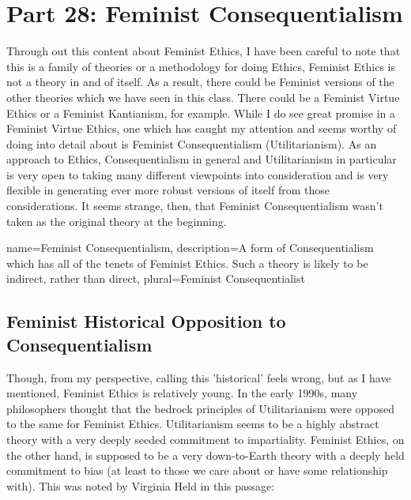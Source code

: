 \chapter{Part 28: Feminist Consequentialism}

Through out this content about Feminist Ethics, I have been careful to note that this is a family of theories or a methodology for doing Ethics, Feminist Ethics is not a theory in and of itself. As a result, there could be Feminist versions of the other theories which we have seen in this class. There could be a Feminist Virtue Ethics or a Feminist Kantianism, for example. While I do see great promise in a Feminist Virtue Ethics, one which has caught my attention and seems worthy of doing into detail about is \gls{Feminist Consequentialism} (Utilitarianism).\autocite{Driver2} As an approach to Ethics, Consequentialism in general and Utilitarianism in particular is very open to taking many different viewpoints into consideration and is very flexible in generating ever more robust versions of itself from those considerations. It seems strange, then, that Feminist Consequentialism wasn't taken as the original theory at the beginning.

{
  name=Feminist Consequentialism,
  description={A form of Consequentialism which has all of the tenets of Feminist Ethics. Such a theory is likely to be indirect, rather than direct},
  plural=Feminist Consequentialist
}


\section{Feminist Historical Opposition to Consequentialism}

Though, from my perspective, calling this 'historical' feels wrong, but as I have mentioned, Feminist Ethics is relatively young. In the early 1990s, many philosophers thought that the bedrock principles of Utilitarianism were opposed to the same for Feminist Ethics. Utilitarianism seems to be a highly abstract theory with a very deeply seeded commitment to impartiality. Feminist Ethics, on the other hand, is supposed to be a very down-to-Earth theory with a deeply held commitment to bias (at least to those we care about or have some relationship with). This was noted by Virginia Held in this passage:\autocite{Held1}


